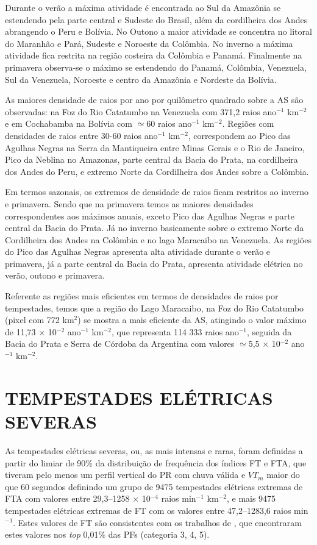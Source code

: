 Durante o verão a máxima atividade é encontrada ao Sul da Amazônia se estendendo pela parte central e Sudeste do Brasil, além da cordilheira dos Andes abrangendo o Peru e Bolívia. No Outono a maior atividade se concentra no litoral do Maranhão e Pará, Sudeste e Noroeste  da Colômbia. No inverno a máxima atividade  fica restrita na região costeira da Colômbia e Panamá. Finalmente na primavera observa-se o máximo se estendendo do Panamá, Colômbia, Venezuela, Sul da Venezuela, Noroeste e centro da Amazônia e Nordeste da Bolívia. 
 
As maiores densidade de raios por ano por quilômetro quadrado sobre a AS são observadas: na Foz do Rio Catatumbo na Venezuela com 371,2 raios ano$^{-1}$ km$^{-2}$ e em Cochabamba na Bolívia com $\simeq$60  raios ano$^{-1}$ km$^{-2}$. Regiões com densidades de raios entre 30-60 raios ano$^{-1}$ km$^{-2}$, correspondem ao Pico das Agulhas Negras na Serra da Mantiqueira entre Minas Gerais e o Rio de Janeiro, Pico da Neblina no Amazonas, parte central da Bacia do Prata, na cordilheira dos Andes do Peru, e extremo Norte da Cordilheira dos Andes sobre a Colômbia. 

Em termos sazonais, os extremos de densidade de raios ficam restritos ao inverno e primavera. Sendo que na primavera temos as maiores densidades correspondentes aos máximos anuais, exceto Pico das Agulhas Negras e parte central da Bacia do Prata. Já no inverno basicamente sobre o extremo Norte da Cordilheira dos Andes na Colômbia e no lago Maracaibo na Venezuela. As regiões do Pico das Agulhas Negras apresenta alta atividade durante o verão e primavera, já  a parte central da Bacia do Prata, apresenta atividade elétrica  no verão, outono e primavera.


Referente as regiões mais eficientes em termos de densidades de raios por tempestades, temos que a região do Lago Maracaibo, na Foz do Rio Catatumbo (pixel com 772 km$^{2}$) se mostra a mais eficiente da AS, atingindo o valor máximo de 11,73 $\times$ 10$^{-2}$ ano$^{-1}$ km$^{-2}$, que representa {114 333} raios ano$^{-1}$, seguida da Bacia do Prata e Serra de Córdoba da Argentina com valores $\simeq$5,5 $\times$ 10$^{-2}$ ano$^{-1}$ km$^{-2}$.


\section{TEMPESTADES ELÉTRICAS SEVERAS}

As tempestades elétricas severas, ou, as mais intensas e raras, foram definidas a partir do limiar de 90\% da distribuição de frequência dos índices FT e FTA, que tiveram pelo menos um perfil vertical do PR com chuva válida e $VT_m$ maior do que 60 segundos  definindo um grupo de 9475 tempestades elétricas extremas de FTA com valores entre 29,3--1258 $\times$ 10$^{-4}$ raios min$^{-1}$ km$^{-2}$, e mais 9475 tempestades elétricas extremas de FT com os valores entre 47,2--1283,6 raios min$^{-1}$.  Estes valores de FT são consistentes com os trabalhos de , que encontraram estes valores nos \textit{top} 0,01\% das PFs (categoria 3, 4, 5).


